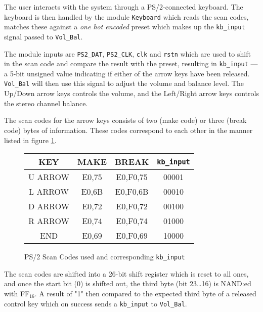 The user interacts with the system through a PS/2-connected keyboard. The keyboard is then handled by the module \verb?Keyboard? which reads the scan codes, matches these against a \emph{one hot encoded} preset which makes up the \verb?kb_input? signal passed to \verb?Vol_Bal?.

The module inputs are \verb=PS2_DAT=, \verb=PS2_CLK=, \verb=clk= and \verb=rstn= which are used to shift in the scan code and compare the result with the preset, resulting in \verb=kb_input= --- a 5-bit unsigned value indicating if either of the arrow keys have been released. \verb=Vol_Bal= will then use this signal to adjust the volume and balance level. The Up/Down arrow keys controls the volume, and the Left/Right arrow keys controls the stereo channel balance.

The scan codes for the arrow keys consists of two (make code) or three (break code) bytes of information. These codes correspond to each other in the manner listed in figure \ref{fig:scancodes}. 

\begin{figure}[h]
\centering
\caption{PS/2 Scan Codes used and corresponding \texttt{kb\_input}}
\begin{tabular}{|c|c|c|c|}
\hline
KEY & MAKE & BREAK & \verb+kb_input+\\ \hline
U ARROW & E0,75 & E0,F0,75 & 00001\\ \hline
L ARROW & E0,6B & E0,F0,6B & 00010\\ \hline
D ARROW & E0,72 & E0,F0,72 & 00100\\ \hline
R ARROW & E0,74 & E0,F0,74 & 01000\\ \hline
END		& E0,69 & E0,F0,69 & 10000\\ \hline
\end{tabular}
\label{fig:scancodes}
\end{figure}

The scan codes are shifted into a 26-bit shift register which is reset to all ones, and once the start bit (0) is shifted out, the third byte (bit 23\ldots16) is NAND:ed with FF$_{16}$. A result of "1" then compared to the expected third byte of a released control key which on success sends a \verb+kb_input+ to \verb+Vol_Bal+.

